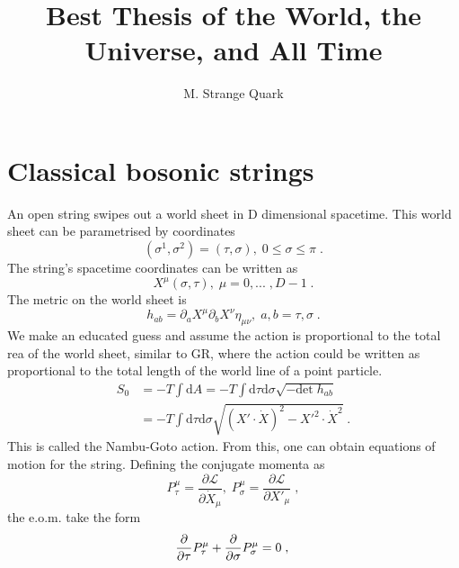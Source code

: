 \documentclass[11pt]{article} %
\title{Best Thesis of the World, the Universe, and All Time}
\author{M. Strange Quark}
\begin{document}
\renewcommand{\i}{\mathrm{i}} 
\renewcommand{\d}{\mathrm{d}} 
\newcommand{\e}{\mathrm{e}} 
\newcommand{\g}{\mathrm{g}} 
\newcommand{\pb}[1]{\left[ #1\right]_{\mathrm{P.B.}}}

\maketitle

\section{Classical bosonic strings}

An open string swipes out a world sheet in D dimensional spacetime. This world sheet can be parametrised by coordinates
\begin{equation}
	(\sigma^1, \sigma^2) = (\tau, \sigma),\; 0\leq \sigma\leq\pi\;.
\end{equation}
The string's spacetime coordinates can be written as
\begin{equation}
	X^{\mu}(\sigma, \tau),\; \mu = 0 ,...\;,D-1\;.
\end{equation}
The metric on the world sheet is
\begin{equation}
	h_{ab} = \partial_aX^{\mu}\partial_bX^{\nu}\eta_{\mu\nu},\; a, b = \tau, \sigma\;.
\end{equation}
We make an educated guess and assume the action is proportional to the total rea of the world sheet, similar to GR, where the action could be written as proportional to the total length of the world line of a point particle.
\begin{align}
	S_0 &= -T\int\d A = -T\int\d\tau\d\sigma \sqrt{ -\mathrm{det}\;h_{ab}}\\
	       &= -T\int\d\tau\d\sigma \sqrt{ \left( X'\cdot\dot{X}\right)^2 - X'^2\cdot\dot{X}^2 } \;.
\end{align}
This is called the Nambu-Goto action. From this, one can obtain equations of motion for the string. Defining the conjugate momenta as
\begin{equation}
	P^{\mu}_{\tau} = \dfrac{\partial\mathcal{L}}{\partial\dot{X}_{\mu}},\;P^{\mu}_{\sigma} = \dfrac{\partial\mathcal{L}}{\partial X'_{\mu}}\;,
\end{equation}
the e.o.m. take the form
\begin{equation}
	\dfrac{\partial}{\partial\tau}P^{\mu}_{\tau} + \dfrac{\partial}{\partial\sigma}P^{\mu}_{\sigma} = 0\;,\\
\end{equation}
\end{document}

